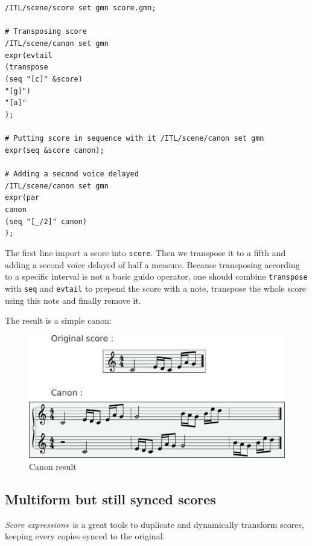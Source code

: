 \documentclass{article}
\newcommand{\OSC}[1]{\texttt{#1}}
\newcommand{\SExpr}{\emph{Score expressions}}
\newcommand{\lowTilde}{\texttildelow}
\newcommand{\tab}{\hspace*{4mm}}
\newcommand{\sample}	[1]			{\vspace{-0.2em}\begin{center}\colorbox{mygrey}{\begin{minipage}[t]{0.95\columnwidth} {\small \texttt{#1}}\end{minipage}}\end{center}}
\begin{document}
\sample{/ITL/scene/score set gmn score.gmn;\\
\\
\# Transposing score\\
/ITL/scene/canon set gmn\\
\tab expr(evtail\\
\tab\tab(transpose\\
\tab\tab\tab(seq "[c]" \&score)\\
\tab\tab\tab"[g]")\\
\tab\tab"[a]"\\
\tab);\\
\\
\# Putting score in sequence with it
/ITL/scene/canon set gmn\\
\tab expr(seq \&score \lowTilde canon);\\
\\
\# Adding a second voice delayed\\
/ITL/scene/canon set gmn\\
\tab expr(par\\
\tab\tab \lowTilde canon\\
\tab\tab (seq "[\_/2]" \lowTilde canon)\\
\tab);
}
The first line import a score into \OSC{score}. Then we transpose it to a fifth and adding a second voice delayed of half a measure. Because transposing according to a specific interval is not a basic guido operator, one should combine \OSC{transpose} with \OSC{seq} and \OSC{evtail} to prepend the score with a note, transpose the whole score using this note and finally remove it.

The result is a simple canon:
\begin{figure}[th]
\centering
\includegraphics[width=1\columnwidth]{imgs/exampleCanon}
\caption{Canon result
\label{fig:canonFig}}
\end{figure}

\subsection{Multiform but still synced scores}
\SExpr\ is a great tools to duplicate and dynamically transform scores, keeping every copies synced to the original.
\end{document}
